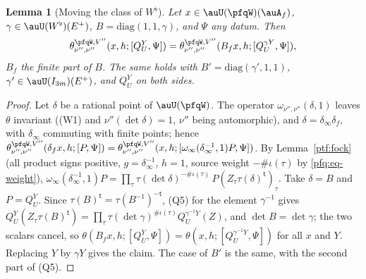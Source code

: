 \documentclass[10pt]{amsart}
\newtheorem{lemma}[theorem]{Lemma}
\theoremstyle{definition}
\theoremstyle{remark}
\begin{document}
\begin{lemma}[Moving the class of $W^\flat$]\label{pfq:move}
Let $x\in\auU(\pfqW)(\auA_f)$, $\gamma\in\auU(W^\flat)(E^+)$, $B=\mathrm{diag}(1,1,\gamma)$, and $\Psi$ any datum. Then
\[
\theta^{\pfqW,V''}_{\nu'',\nu''}(x,h;[Q^Y_U,\Psi])=\theta^{\pfqW,V''}_{\nu'',\nu''}(B_fx,h;[Q^{\gamma Y}_U,\Psi]),
\]
$B_f$ the finite part of $B$. The same holds with $B'=\mathrm{diag}(\gamma',1,1)$, $\gamma'\in\auU(I_{3m})(E^+)$, and
$Q^Y_U$ on both sides.
\end{lemma}
\begin{proof}
Let $\delta$ be a rational point of $\auU(\pfqW)$. The operator $\omega_{\nu'',\nu''}(\delta,1)$ leaves $\theta$ invariant
((W1) and $\nu''(\det\delta)=1$, $\nu''$ being automorphic), and $\delta=\delta_\infty\delta_f$, with $\delta_\infty$ commuting with
finite points; hence $\theta^{\pfqW,V''}_{\nu'',\nu''}(\delta_fx,h;[P,\Psi])=\theta^{\pfqW,V''}_{\nu'',\nu''}(x,h;[\omega_\infty
(\delta_\infty^{-1},1)P,\Psi])$. By Lemma~\ref{ptf:fock} (all product signs positive, $g=\delta_\infty^{-1}$, $h=1$, source weight
$-\#\iota(\tau)$ by \eqref{pfq:eq-weight}), $\omega_\infty(\delta_\infty^{-1},1)P=\prod_\tau\tau(\det\delta)^{-\#\iota(\tau)}\,
P(Z_\tau\tau(\delta)^{\mathsf t})_\tau$. Take $\delta=B$ and $P=Q^Y_U$. Since $\tau(B)^{\mathsf t}=\tau(B^{-1})^{-\mathsf t}$, (Q5) for the
element $\gamma^{-1}$ gives $Q^Y_U(Z_\tau\tau(B)^{\mathsf t})=\prod_\tau\tau(\det\gamma)^{\#\iota(\tau)}Q^{\gamma^{-1}Y}_U(Z)$, and
$\det B=\det\gamma$; the two scalars cancel, so $\theta(B_fx,h;[Q^Y_U,\Psi])=\theta(x,h;[Q^{\gamma^{-1}Y}_U,\Psi])$ for all $x$ and
$Y$. Replacing $Y$ by $\gamma Y$ gives the claim. The case of $B'$ is the same, with the second part of (Q5).
\end{proof}
\end{document}
